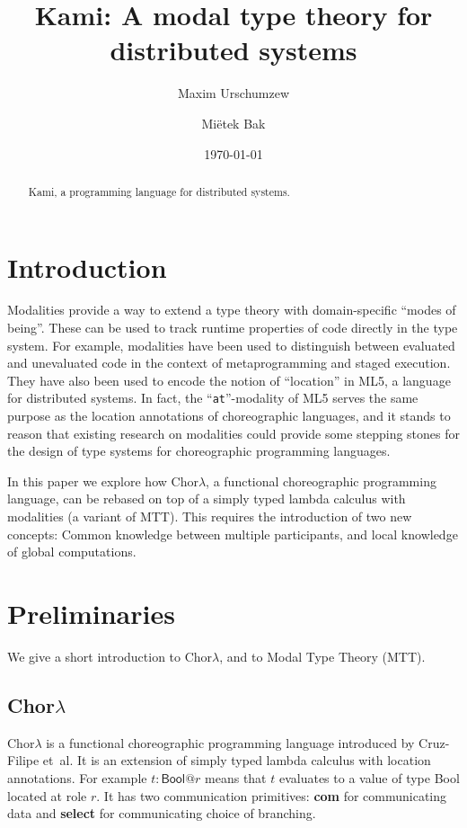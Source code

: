 \documentclass{scrartcl}
\title{Kami: A modal type theory for distributed systems}
\author{Maxim Urschumzew \and Miëtek Bak}
\date{\today}
\theoremstyle{definition}
\theoremstyle{plain}
\begin{document}
\maketitle


\newcommand{\primitive}[1]{\textsf{\textbf{#1}}}
\newcommand{\primitiveMath}[1]{\mathsf{\mathbf{#1}}}
\newcommand{\ChorMTT}{Chor${}_{\textrm{MTT}}$}
\newcommand{\onleftarrow}[1]{\mathop{\smash{\xleftarrow{#1}}}}
\newcommand{\ProcMTT}{Proc${}_{\textrm{MTT}}$}


\begin{abstract}
  Kami, a programming language for distributed systems.
\end{abstract}

\section{Introduction}
Modalities provide a way to extend a type theory with domain-specific
``modes of being''. These can be used to track runtime properties of code
directly in the type system. For example, modalities have been used to
distinguish between evaluated and unevaluated code in the context of
metaprogramming and staged execution\cite{davies2001modal}. They have also been used to encode the
notion of ``location'' in ML5\cite{murphy2008modal}, a language for distributed
systems. In fact, the ``\texttt{at}''-modality of ML5 serves the same purpose as the
location annotations of choreographic
languages\cite{cruz2022functional,giallorenzo2005object}, and it stands to
reason that existing research on modalities could provide some stepping stones
for the design of type systems for choreographic programming languages.

\medskip

In this paper we explore how Chor$\lambda$\cite{cruz2022functional}, a functional choreographic
programming language, can be rebased on top of a simply typed lambda calculus
with modalities (a variant of MTT\cite{gratzer2023syntax}).
This requires the introduction of two new concepts: Common
knowledge between multiple participants, and local knowledge of global computations.

\section{Preliminaries}
We give a short introduction to Chor$\lambda$, and to Modal Type Theory (MTT).

\subsection{Chor$\lambda$}
Chor$\lambda$\cite{cruz2022functional} is a functional choreographic programming language introduced by
Cruz-Filipe et~al. It is an extension of simply typed lambda calculus with
location annotations. For example $t :
\textsf{Bool} @ r$ means that $t$ evaluates to a value of type \textsf{Bool}
located at role $r$. It has two communication primitives: \primitive{com} for
communicating data and \primitive{select} for communicating choice of branching.
\end{document}
